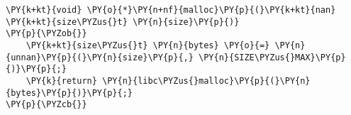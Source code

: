 \begin{Verbatim}[commandchars=\\\{\},codes={\catcode`\$=3\catcode`\^=7\catcode`\_=8}]
\PY{k+kt}{void} \PY{o}{*}\PY{n+nf}{malloc}\PY{p}{(}\PY{k+kt}{nan} \PY{k+kt}{size\PYZus{}t} \PY{n}{size}\PY{p}{)}
\PY{p}{\PYZob{}}
    \PY{k+kt}{size\PYZus{}t} \PY{n}{bytes} \PY{o}{=} \PY{n}{unnan}\PY{p}{(}\PY{n}{size}\PY{p}{,} \PY{n}{SIZE\PYZus{}MAX}\PY{p}{)}\PY{p}{;}
    \PY{k}{return} \PY{n}{libc\PYZus{}malloc}\PY{p}{(}\PY{n}{bytes}\PY{p}{)}\PY{p}{;}
\PY{p}{\PYZcb{}}
\end{Verbatim}
